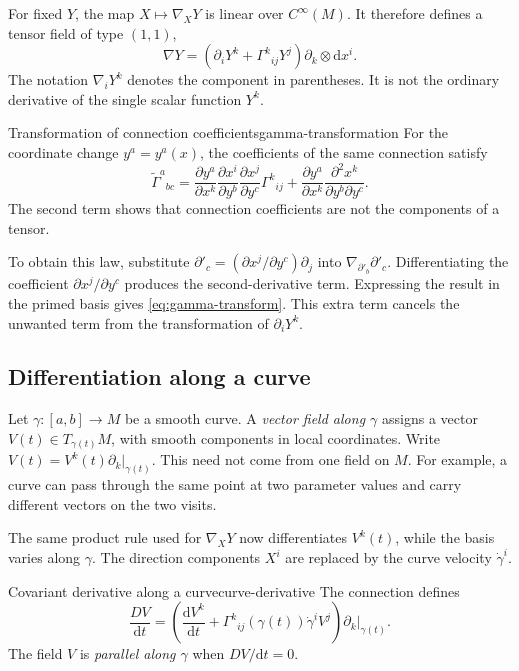 \documentclass[11pt,a4paper]{article}
\numberwithin{equation}{section}
\newcommand{\dd}{\mathrm d}
\newcommand{\Cinf}{C^\infty}
\begin{document}
For fixed \(Y\), the map \(X\mapsto\nabla_XY\) is linear over
\(\Cinf(M)\). It therefore defines a tensor field of type \((1,1)\),
\[
 \nabla Y=(\partial_iY^k+\Gamma^k{}_{ij}Y^j)
           \partial_k\otimes\dd x^i.
\]
The notation \(\nabla_iY^k\) denotes the component in parentheses. It
is not the ordinary derivative of the single scalar function \(Y^k\).

\begin{proposition}{Transformation of connection coefficients}{gamma-transformation}
For the coordinate change \(y^a=y^a(x)\), the coefficients of the same
connection satisfy
\begin{equation}
 \widetilde\Gamma^a{}_{bc}
 =\frac{\partial y^a}{\partial x^k}
  \frac{\partial x^i}{\partial y^b}
  \frac{\partial x^j}{\partial y^c}\Gamma^k{}_{ij}
 +\frac{\partial y^a}{\partial x^k}
  \frac{\partial^2x^k}{\partial y^b\partial y^c}.
 \label{eq:gamma-transform}
\end{equation}
The second term shows that connection coefficients are not the
components of a tensor.
\end{proposition}

To obtain this law, substitute
\(\partial'_c=(\partial x^j/\partial y^c)\partial_j\) into
\(\nabla_{\partial'_b}\partial'_c\). Differentiating the coefficient
\(\partial x^j/\partial y^c\) produces the second-derivative term.
Expressing the result in the primed basis gives
\eqref{eq:gamma-transform}. This extra term cancels the unwanted term
from the transformation of \(\partial_iY^k\).

\subsection{Differentiation along a curve}

Let \(\gamma:[a,b]\to M\) be a smooth curve. A \emph{vector field along
\(\gamma\)} assigns a vector \(V(t)\in T_{\gamma(t)}M\), with smooth
components in local coordinates. Write
\(V(t)=V^k(t)\partial_k|_{\gamma(t)}\). This need not come from one field
on \(M\). For example, a curve can pass through the same point at two
parameter values and carry different vectors on the two visits.

The same product rule used for \(\nabla_XY\) now differentiates
\(V^k(t)\), while the basis varies along \(\gamma\). The direction
components \(X^i\) are replaced by the curve velocity \(\dot\gamma^i\).

\begin{definition}{Covariant derivative along a curve}{curve-derivative}
The connection defines
\begin{equation}
 \frac{DV}{\dd t}
 =\left(\frac{\dd V^k}{\dd t}
        +\Gamma^k{}_{ij}(\gamma(t))\dot\gamma^i V^j\right)
       \partial_k|_{\gamma(t)}.
 \label{eq:curve-covariant}
\end{equation}
The field \(V\) is \emph{parallel along \(\gamma\)} when
\(DV/\dd t=0\).
\end{definition}
\end{document}
